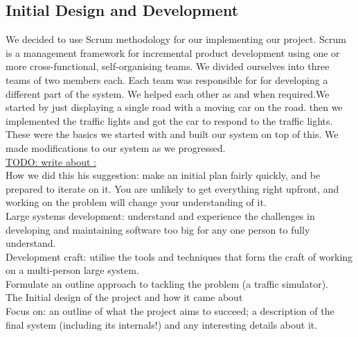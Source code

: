 \documentclass{article}[11pt,Tahoma]
\begin{document}
		 \subsection{Initial Design and Development}
		  	We decided to use Scrum methodology for our implementing our project. Scrum is a management framework for incremental product development using one or more cross-functional, self-organising teams. We divided ourselves into three teams of two members each. Each team was responsible for for developing a different part of the system. We helped each other as and when required.We started by just displaying a single road with a moving car on the road. then we implemented the traffic lights and got the car to respond to the traffic lights. These were the basics we started with and built our system on top of this. We made modifications to our system as we progressed. \\
		 
		 \underline{ TODO: write about :}\\
		 	How we did this his suggestion: make an initial plan fairly quickly, and be prepared to iterate on it. You are unlikely to get everything right upfront, and working on the problem will change your understanding of it.\\
		 
			Large systems development: understand and experience the challenges in developing and maintaining software too big for any one person to fully understand.\\
		 
		 	Development craft: utilise the tools and techniques that form the craft of working on a multi-person large system.\\
		 
		 	Formulate an outline approach to tackling the problem (a traffic simulator). \\
		 
		 	The Initial design of the project and how it came about\\
		 
		 	Focus on: an outline of what the project aims to succeed; a description of the final system (including its internals!) and any interesting details about it.
\end{document}
